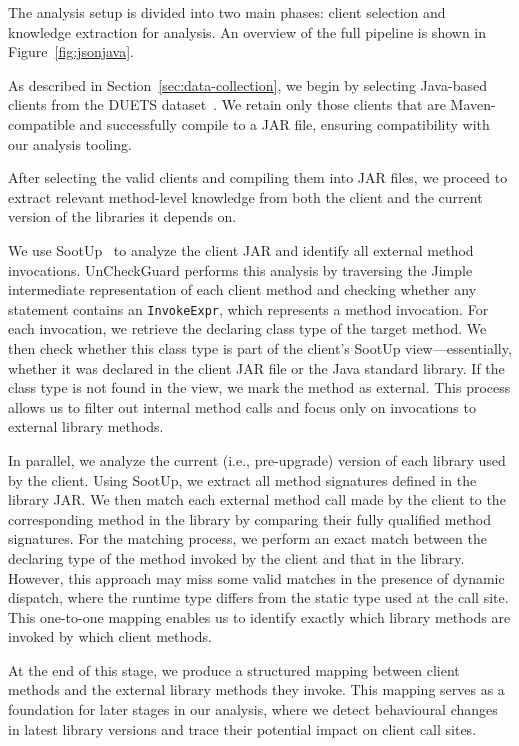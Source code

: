 The analysis setup is divided into two main phases: client selection and knowledge extraction for analysis. An overview of the full pipeline is shown in Figure~\ref{fig:jsonjava}.

As described in Section~\ref{sec:data-collection}, we begin by selecting Java-based clients from the DUETS dataset~\cite{durieux21:_duets}. We retain only those clients that are Maven-compatible and successfully compile to a JAR file, ensuring compatibility with our analysis tooling.

After selecting the valid clients and compiling them into JAR files, we proceed to extract relevant method-level knowledge from both the client and the current version of the libraries it depends on.

We use SootUp~\cite{Karakaya24:_sootup} to analyze the client JAR and identify all external method invocations. UnCheckGuard performs this analysis by traversing the Jimple intermediate representation of each client method and checking whether any statement contains an \texttt{InvokeExpr}, which represents a method invocation. For each invocation, we retrieve the declaring class type of the target method. We then check whether this class type is part of the client’s SootUp view---essentially, whether it was declared in the client JAR file or the Java standard library. If the class type is not found in the view, we mark the method as external. This process allows us to filter out internal method calls and focus only on invocations to external library methods.

In parallel, we analyze the current (i.e., pre-upgrade) version of each library used by the client. Using SootUp, we extract all method signatures defined in the library JAR. We then match each external method call made by the client to the corresponding method in the library by comparing their fully qualified method signatures. For the matching process, we perform an exact match between the declaring type of the method invoked by the client and that in the library. However, this approach may miss some valid matches in the presence of dynamic dispatch, where the runtime type differs from the static type used at the call site. This one-to-one mapping enables us to identify exactly which library methods are invoked by which client methods.

At the end of this stage, we produce a structured mapping between client methods and the external library methods they invoke. This mapping serves as a foundation for later stages in our analysis, where we detect behavioural changes in latest library versions and trace their potential impact on client call sites.

